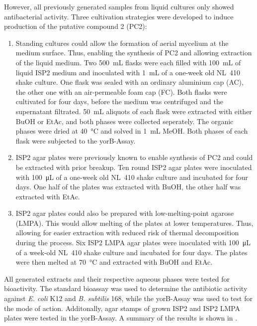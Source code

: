 However, all previously generated samples from liquid cultures only showed antibacterial activity.
Three cultivation strategies were developed to induce production of the putative compound 2 (PC2):

\begin{enumerate}
    \item
	    Standing cultures could allow the formation of aerial mycelium at the medium surface.
	    Thus, enabling the synthesis of PC2 and allowing extraction of the liquid medium.
	    Two \SI{500}{\milli\liter} flasks were each filled with \SI{100}{\milli\liter} of liquid ISP2 medium and inoculated with \SI{1}{\milli\liter} of a one-week old NL~410 shake culture.
	    One flask was sealed with an ordinary aluminium cap (AC), the other one with an air-permeable foam cap (FC).
	    Both flasks were cultivated for four days, before the medium was centrifuged and the supernatant filtrated.
	    \SI{50}{\milli\liter} aliquots of each flask were extracted with either BuOH or EtAc, and both phases were collected seperately.
	    The organic phases were dried at \SI{40}{\celsius} and solved in \SI{1}{\milli\liter} MeOH.
	    Both phases of each flask were subjected to the yorB-Assay.
    \item
		ISP2 agar plates were previously known to enable synthesis of PC2 and could be extracted with prior breakup.
		Ten round ISP2 agar plates were inoculated with \SI{100}{\micro\liter} of a one-week old NL~410 shake culture and incubated for four days.
		One half of the plates was extracted with BuOH, the other half was extracted with EtAc.
    \item
        ISP2 agar plates could also be prepared with low-melting-point agarose (LMPA).
        This would allow melting of the plates at lower temperatures.
        Thus, allowing for easier extraction with reduced risk of thermal decomposition during the process.
        Six ISP2 LMPA agar plates were inoculated with \SI{100}{\micro\liter} of a week-old NL~410 shake culture and incubated for four days.
        The plates were then melted at \SI{70}{\celsius} and extracted with BuOH and EtAc.
\end{enumerate}

All generated extracts and their respective aqueous phases were tested for bioactivity.
The standard bioassay was used to determine the antibiotic activity against \textit{E. coli} K12 and \textit{B. subtilis} 168, while the yorB-Assay was used to test for the mode of action.
Additonally, agar stamps of grown ISP2 and ISP2 LMPA plates were tested in the yorB-Assay.
A summary of the results is shown in .

